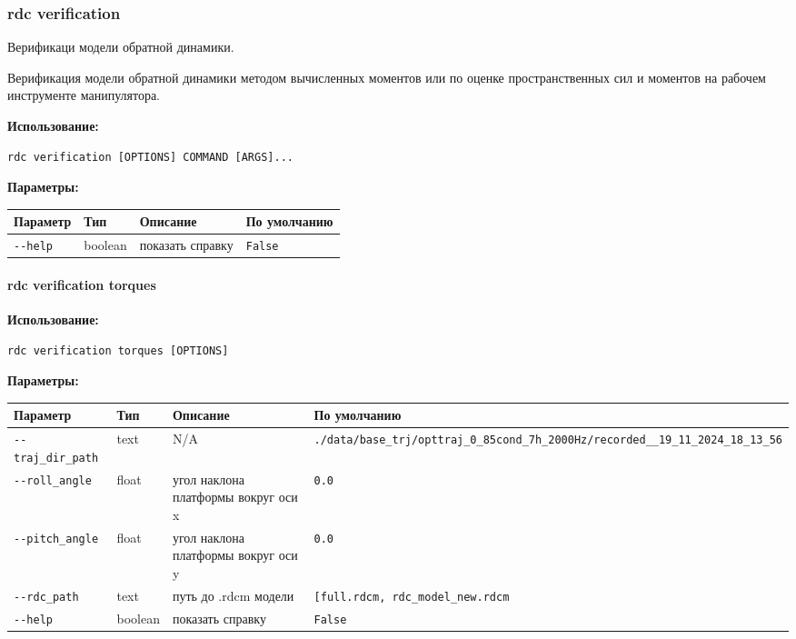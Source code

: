 \hypertarget{rdc-verification}{%
\subsubsection{rdc verification}\label{rdc-verification}}

Верификаци модели обратной динамики.

Верификация модели обратной динамики методом вычисленных моментов или по оценке пространственных сил и моментов на рабочем инструменте манипулятора.

\textbf{Использование:}
\begin{lstlisting}[language=python, numbers=none, frame=single]
rdc verification [OPTIONS] COMMAND [ARGS]...
\end{lstlisting}

\textbf{Параметры:}
\begin{center}
\fontsize{10pt}{10pt}\selectfont
\begin{longtable}[]{p{5cm}|p{2cm}|p{3.5cm}|p{5cm}}
    \hline
\toprule()
Параметр & Тип & Описание & По умолчанию \\
\hline
\midrule()
\endhead
\texttt{-\/-help} & boolean & показать справку &
\texttt{False} \\
\bottomrule()
\hline
\end{longtable}
\end{center}

\hypertarget{rdc-verification-torques}{%
\paragraph{rdc verification torques}\label{rdc-verification-torques}}

\textbf{Использование:}
\begin{lstlisting}[language=python, numbers=none, frame=single]
rdc verification torques [OPTIONS]
\end{lstlisting}

\textbf{Параметры:}
\begin{center}
\fontsize{10pt}{10pt}\selectfont
\begin{longtable}[]{p{5cm}|p{2cm}|p{3.5cm}|p{5cm}}
    \hline
\toprule()
Параметр & Тип & Описание & По умолчанию \\
\hline
\midrule()
\endhead
\texttt{-\/-traj\_dir\_path} & text & N/A &
\texttt{./data/base\_trj/opttraj\_0\_85cond\_7h\_2000Hz/recorded\_\_19\_11\_2024\_18\_13\_56} \\
\hline
\texttt{-\/-roll\_angle} & float & угол наклона платформы вокруг оси x & \texttt{0.0} \\
\hline
\texttt{-\/-pitch\_angle} & float & угол наклона платформы вокруг оси y & \texttt{0.0} \\
\hline
\texttt{-\/-rdc\_path} & text & путь до .rdcm модели &
\texttt{{[}\textquotesingle{}full.rdcm\textquotesingle{},\ \textquotesingle{}rdc\_model\_new.rdcm\textquotesingle{}{]}} \\
\hline
\texttt{-\/-help} & boolean & показать справку &
\texttt{False} \\
\bottomrule()
\hline
\end{longtable}
\end{center}


